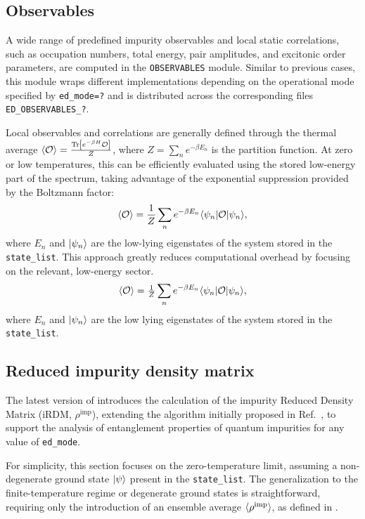 \documentclass[edipack2.tex]{subfiles}
\begin{document}
\subsection{Observables}\label{sSecObc}
A wide range of predefined impurity observables and local 
static correlations, such as occupation numbers, total 
energy, pair amplitudes, and excitonic order parameters, 
are computed in the \texttt{OBSERVABLES} module. Similar to 
previous cases, this module wraps different implementations 
depending on the operational mode specified by 
{\tt ed\_mode=?} and is distributed across the corresponding 
files {\tt ED\_OBSERVABLES\_?}. 



Local observables and correlations are generally defined 
through the thermal average 
$\langle {\cal O}\rangle = \frac{{\rm Tr}\left[e^{-\beta H}{\cal O}\right]}{Z}$, 
where $Z = \sum_n e^{-\beta E_n}$ is the partition function. 
At zero or low temperatures, this can be efficiently 
evaluated using the stored low-energy part of the spectrum, 
taking advantage of the exponential suppression provided by 
the Boltzmann factor:
\begin{equation}
\langle {\cal O}\rangle = \frac{1}{Z}\sum_n e^{-\beta E_n}
\langle \psi_n| {\cal O} |\psi_n\rangle,
\label{eq:thermal_average}
\end{equation}
where $E_n$ and $|\psi_n\rangle$ are the low-lying eigenstates 
of the system stored in the {\tt state\_list}. This approach 
greatly reduces computational overhead by focusing on the 
relevant, low-energy sector.
\begin{equation}
  \langle {\cal O}\rangle  = \tfrac{1}{Z}\sum_n e^{-\beta  E_n}
  \langle \psi_n|{\cal O}|\psi_n\rangle,
  \label{eq:thermal_average}
\end{equation}
where $E_n$ and $|\psi_n\rangle$ are the low lying eigenstates of the
system stored in the {\tt state\_list}. 


\subsection{Reduced impurity density matrix}\label{sSecRDM}
The latest version of \NAME introduces the calculation of the 
impurity Reduced Density Matrix (iRDM, $\rho^\mathrm{imp}$), 
extending the algorithm initially proposed in 
Ref.~, to support the analysis of entanglement 
properties of quantum impurities for any value of  {\tt ed\_mode}.

For simplicity, this section focuses on the zero-temperature limit, 
assuming a non-degenerate ground state $|\psi\rangle$ present in the 
{\tt state\_list}. The generalization to the finite-temperature regime 
or degenerate ground states is straightforward, requiring only the 
introduction of an
ensemble average $\langle \rho^\mathrm{imp} \rangle$, as defined in 
.
\end{document}
